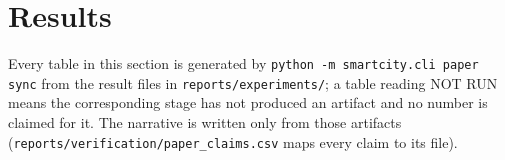 \section{Results}
\label{sec:results}
Every table in this section is generated by \texttt{python -m smartcity.cli paper sync} from the result files in
\texttt{reports/experiments/}; a table reading NOT RUN means the corresponding stage has not produced an artifact
and no number is claimed for it. The narrative is written only from those artifacts
(\texttt{reports/verification/paper\_claims.csv} maps every claim to its file).














